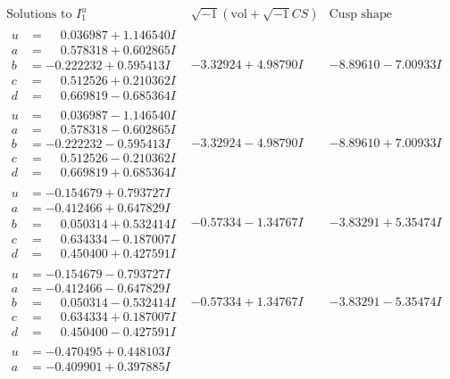 \documentclass[1p]{elsarticle_modified}
\theoremstyle{definition}
\newcommand{\I}{\sqrt{-1}}
\begin{document}
$$\begin{array}{c|c|c}  
\text{Solutions to }I^u_{1}& \I (\text{vol} + \sqrt{-1}CS) & \text{Cusp shape}\\
 \hline 
\begin{aligned}
u &= \phantom{-}0.036987 + 1.146540 I \\
a &= \phantom{-}0.578318 + 0.602865 I \\
b &= -0.222232 + 0.595413 I \\
c &= \phantom{-}0.512526 + 0.210362 I \\
d &= \phantom{-}0.669819 - 0.685364 I\end{aligned}
 & -3.32924 + 4.98790 I & -8.89610 - 7.00933 I \\ \hline\begin{aligned}
u &= \phantom{-}0.036987 - 1.146540 I \\
a &= \phantom{-}0.578318 - 0.602865 I \\
b &= -0.222232 - 0.595413 I \\
c &= \phantom{-}0.512526 - 0.210362 I \\
d &= \phantom{-}0.669819 + 0.685364 I\end{aligned}
 & -3.32924 - 4.98790 I & -8.89610 + 7.00933 I \\ \hline\begin{aligned}
u &= -0.154679 + 0.793727 I \\
a &= -0.412466 + 0.647829 I \\
b &= \phantom{-}0.050314 + 0.532414 I \\
c &= \phantom{-}0.634334 - 0.187007 I \\
d &= \phantom{-}0.450400 + 0.427591 I\end{aligned}
 & -0.57334 - 1.34767 I & -3.83291 + 5.35474 I \\ \hline\begin{aligned}
u &= -0.154679 - 0.793727 I \\
a &= -0.412466 - 0.647829 I \\
b &= \phantom{-}0.050314 - 0.532414 I \\
c &= \phantom{-}0.634334 + 0.187007 I \\
d &= \phantom{-}0.450400 - 0.427591 I\end{aligned}
 & -0.57334 + 1.34767 I & -3.83291 - 5.35474 I \\ \hline\begin{aligned}
u &= -0.470495 + 0.448103 I \\
a &= -0.409901 + 0.397885 I \\

\end{aligned}
\end{array}$$
\end{document}
